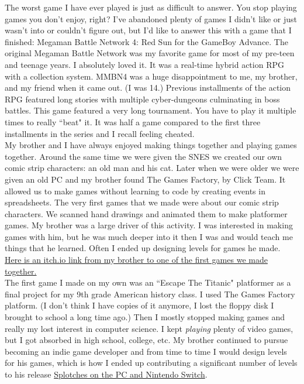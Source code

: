 \documentclass[12pt]{article}
\begin{document}
\noindent The worst game I have ever played is just as difficult to answer. You stop playing games you don't enjoy, right? I've abandoned plenty of games I didn't like or just wasn't into or couldn't figure out, but I'd like to answer this with a game that I finished: Megaman Battle Network 4: Red Sun for the GameBoy Advance. The original Megaman Battle Network was my favorite game for most of my pre-teen and teenage years. I absolutely loved it. It was a real-time hybrid action RPG with a collection system. MMBN4 was a huge disappointment to me, my brother, and my friend when it came out. (I was 14.) Previous installments of the action RPG featured long stories with multiple cyber-dungeons culminating in boss battles. This game featured a very long tournament. You have to play it multiple times to really ``beat" it. It was half a game compared to the first three installments in the series and I recall feeling cheated. \\

\noindent My brother and I have always enjoyed making things together and playing games together. Around the same time we were given the SNES we created our own comic strip characters: an old man and his cat. Later when we were older we were given an old PC and my brother found The Games Factory, by Click Team. It allowed us to make games without learning to code by creating events in spreadsheets. The very first games that we made were about our comic strip characters. We scanned hand drawings and animated them to make platformer games. My brother was a large driver of this activity. I was interested in making games with him, but he was much deeper into it then I was and would teach me things that he learned. Often I ended up designing levels for games he made. \href{https://cloopadoop.itch.io/oldmanclayton-save-fdk?password=shobibbobolobeth}{Here is an itch.io link from my brother to one of the first games we made together.}\\

\noindent The first game I made on my own was an ``Escape The Titanic" platformer as a final project for my 9th grade American history class. I used The Games Factory platform. (I don't think I have copies of it anymore, I lost the floppy disk I brought to school a long time ago.) Then I mostly stopped making games and really my lost interest in computer science. I kept \emph{playing} plenty of video games, but I got absorbed in high school, college, etc. My brother continued to pursue becoming an indie game developer and from time to time I would design levels for his games, which is how I ended up contributing a significant number of levels to his release \href{https://jollycrouton.com/splotches}{Splotches on the PC and Nintendo Switch}.\\
\end{document}
